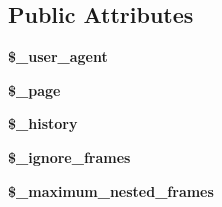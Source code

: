 \subsection*{Public Attributes}
\begin{DoxyCompactItemize}
\item 
\hypertarget{class_simple_browser_ab419448308a48c9ec793275ca8761b79}{
{\bfseries \$\_\-user\_\-agent}}
\label{class_simple_browser_ab419448308a48c9ec793275ca8761b79}

\item 
\hypertarget{class_simple_browser_a46fd6d5da834b110e782870758ee1a2a}{
{\bfseries \$\_\-page}}
\label{class_simple_browser_a46fd6d5da834b110e782870758ee1a2a}

\item 
\hypertarget{class_simple_browser_a5e4b266e602053982d232e335c396fee}{
{\bfseries \$\_\-history}}
\label{class_simple_browser_a5e4b266e602053982d232e335c396fee}

\item 
\hypertarget{class_simple_browser_adfeb05f79fdd256ee13dab73e784df0d}{
{\bfseries \$\_\-ignore\_\-frames}}
\label{class_simple_browser_adfeb05f79fdd256ee13dab73e784df0d}

\item 
\hypertarget{class_simple_browser_ad2f00082bfa6d508cb3936877e0a66b6}{
{\bfseries \$\_\-maximum\_\-nested\_\-frames}}
\label{class_simple_browser_ad2f00082bfa6d508cb3936877e0a66b6}

\end{DoxyCompactItemize}


